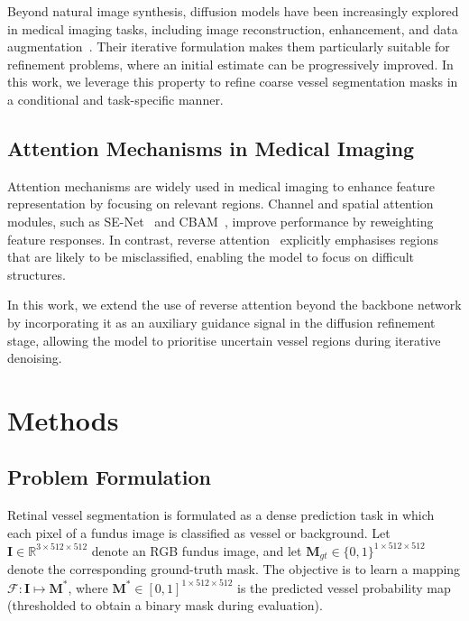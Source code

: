 \documentclass[journal,article,submit,pdftex,moreauthors]{Definitions/mdpi}
\begin{document}
Beyond natural image synthesis, diffusion models have been increasingly explored in medical imaging tasks, including image reconstruction, enhancement, and data augmentation~\cite{Wolleb2023}. Their iterative formulation makes them particularly suitable for refinement problems, where an initial estimate can be progressively improved. In this work, we leverage this property to refine coarse vessel segmentation masks in a conditional and task-specific manner.

\subsection{Attention Mechanisms in Medical Imaging}

Attention mechanisms are widely used in medical imaging to enhance feature representation by focusing on relevant regions. Channel and spatial attention modules, such as SE-Net~\cite{Hu2018} and CBAM~\cite{Woo2018}, improve performance by reweighting feature responses. In contrast, reverse attention~\cite{Hernandez2025} explicitly emphasises regions that are likely to be misclassified, enabling the model to focus on difficult structures.

In this work, we extend the use of reverse attention beyond the backbone network by incorporating it as an auxiliary guidance signal in the diffusion refinement stage, allowing the model to prioritise uncertain vessel regions during iterative denoising.

\section{Methods}
\label{sec:methods}

\subsection{Problem Formulation}
\label{sec:problem}

Retinal vessel segmentation is formulated as a dense prediction task in which each pixel of a fundus image is classified as vessel or background. Let $\mathbf{I}\in\mathbb{R}^{3\times512\times512}$ denote an RGB fundus image, and let $\mathbf{M}_{gt}\in\{0,1\}^{1\times512\times512}$ denote the corresponding ground-truth mask. The objective is to learn a mapping $\mathcal{F}:\mathbf{I}\mapsto \mathbf{M}^*$, where $\mathbf{M}^*\in[0,1]^{1\times512\times512}$ is the predicted vessel probability map (thresholded to obtain a binary mask during evaluation).
\end{document}
